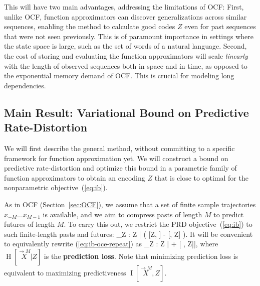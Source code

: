 \documentclass[entropy,article,submit,moreauthors,pdftex,10pt,a4paper]{Definitions/mdpi}
\newcommand{\key}{\textbf}
\newcommand{\finitefuture}{\stackrel{\rightarrow \scriptscriptstyle{M}}{X}}
\newcommand{\finitepast}{\stackrel{\scriptscriptstyle{M}\leftarrow}{X}}%
\let\oldequation\equation
\let\oldendequation\endequation
\renewenvironment{equation}
  {\linenomathNonumbers\oldequation}
  {\oldendequation\endlinenomath}
\begin{document}
This will have two main advantages, addressing the limitations of OCF:
First, unlike OCF, function approximators can discover generalizations across similar sequences, enabling the method to calculate good codes $Z$ even for past sequences that were not seen previously.
This is of paramount importance in settings where the state space is large, such as the set of words of a natural language.
Second, the cost of storing and evaluating the function approximators will scale \emph{linearly} with the length of observed sequences both in space and in time, as opposed to the exponential memory demand of OCF.
This is crucial for modeling long dependencies.

\subsection{Main Result: Variational Bound on Predictive Rate-Distortion}
We will first describe the general method, without committing to a specific framework for function approximation yet.
We will construct a bound on predictive rate-distortion and optimize this bound in a parametric family of function approximators to obtain an encoding $Z$ that is close to optimal for the nonparametric objective~(\ref{eq:ib}).

As in OCF (Section~\ref{sec:OCF}), we assume that a set of finite sample trajectories $x_{-M} \dots x_{M-1}$ is available, and we aim to compress pasts of length $M$ to predict futures of length $M$. To carry this out, we restrict the PRD objective~(\ref{eq:ib}) to such finite-length pasts and futures: 
\begin{equation}\label{eq:ib-oce-repeat}
	\max_{Z : Z \bot \finitefuture | \finitepast} \left( [Z, \finitefuture] - \lambda \cdot {}[\finitepast, Z] \right).
\end{equation}
It will be convenient to equivalently rewrite (\ref{eq:ib-oce-repeat}) as
\begin{equation}\label{eq:prd-loss}
	\min_{Z : Z \bot \finitefuture | \finitepast}	\left[\operatorname{H}[\finitefuture | Z] + \lambda \cdot{}[ \finitepast, Z]\right],
\end{equation}
where $\operatorname{H}[\finitefuture | Z]$ is the \key{prediction loss}. Note that minimizing prediction loss is equivalent to maximizing predictiveness $\operatorname{I}[\finitefuture , Z]$. %
\end{document}
